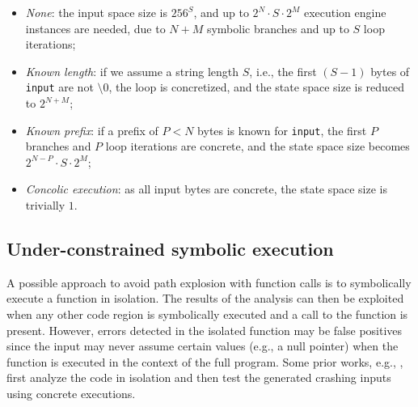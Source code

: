 \begin{itemize}
  \item {\em None}: the input space size is $256^S$, and up to $2^N\cdot S\cdot 2^M$ execution engine instances are needed, due to $N+M$ symbolic branches and up to $S$ loop iterations;
  \item {\em Known length}: if we assume a string length $S$, i.e., the first $(S-1)$ bytes of {\tt input} are not $\setminus0$, the loop is concretized, and the state space size is reduced to $2^{N+M}$;
  \item {\em Known prefix}: if a prefix of $P<N$ bytes is known for {\tt input}, the first $P$ branches and $P$ loop iterations are concrete, and the state space size becomes $2^{N-P}\cdot S\cdot 2^M$;
  \item {\em Concolic execution}: as all input bytes are concrete, the state space size is trivially $1$.
\end{itemize}





\subsection{Under-constrained symbolic execution} 
\label{under-constrained}

A possible approach to avoid path explosion with function calls is to symbolically execute a function in isolation. The results of the analysis can then be exploited when any other code region is symbolically executed and a call to the function is present. However, errors detected in the isolated function may be false positives since the input may never assume certain values (e.g., a null pointer) when the function is executed in the context of the full program. Some prior works, e.g., \cite{CS-ICSE05}, first analyze the code in isolation and then test the generated crashing inputs using concrete executions. %

